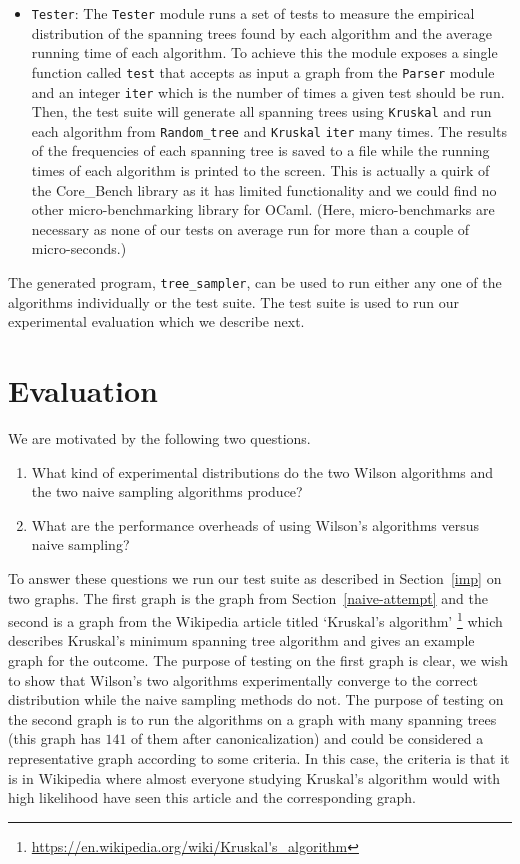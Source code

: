 \documentclass[11pt]{article}
\begin{document}
\begin{itemize}
\item \texttt{Tester}: The \texttt{Tester} module runs a set of tests to measure the empirical distribution of the spanning trees found by each algorithm and the average running time of each algorithm. To achieve this the module exposes a single function called \texttt{test} that accepts as input a graph from the \texttt{Parser} module and an integer \texttt{iter} which is the number of times a given test should be run. Then, the test suite will generate all spanning trees using \texttt{Kruskal} and run each algorithm from \texttt{Random\_tree} and \texttt{Kruskal} \texttt{iter} many times. The results of the frequencies of each spanning tree is saved to a file while the running times of each algorithm is printed to the screen. This is actually a quirk of the Core\_Bench library as it has limited functionality and we could find no other micro-benchmarking library for OCaml. (Here, micro-benchmarks are necessary as none of our tests on average run for more than a couple of micro-seconds.)
\end{itemize}

The generated program, \texttt{tree\_sampler}, can be used to run either any one of the algorithms individually or the test suite. The test suite is used to run our experimental evaluation which we describe next.

\section{Evaluation}\label{eval}

We are motivated by the following two questions.

\begin{enumerate}[1.]
\item What kind of experimental distributions do the two Wilson algorithms and the two naive sampling algorithms produce?
\item What are the performance overheads of using Wilson's algorithms versus naive sampling?
\end{enumerate}

To answer these questions we run our test suite as described in Section~\ref{imp} on two graphs. The first graph is the graph from Section~\ref{naive-attempt} and the second is a graph from the Wikipedia article titled `Kruskal's algorithm' \footnote{\url{https://en.wikipedia.org/wiki/Kruskal's_algorithm}} which describes Kruskal's minimum spanning tree algorithm and gives an example graph for the outcome. The purpose of testing on the first graph is clear, we wish to show that Wilson's two algorithms experimentally converge to the correct distribution while the naive sampling methods do not. The purpose of testing on the second graph is to run the algorithms on a graph with many spanning trees (this graph has $141$ of them after canonicalization) and could be considered a representative graph according to some criteria. In this case, the criteria is that it is in Wikipedia where almost everyone studying Kruskal's algorithm would with high likelihood have seen this article and the corresponding graph.
\end{document}
